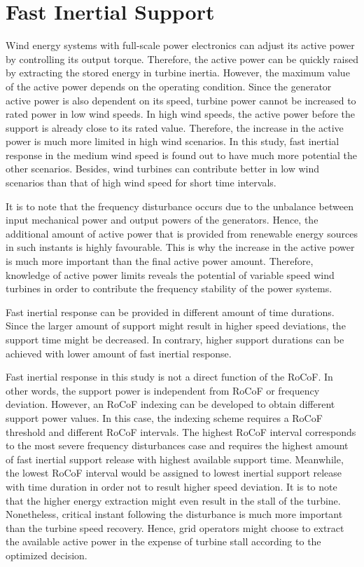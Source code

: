 \section{Fast Inertial Support}
Wind energy systems with full-scale power electronics can adjust its active power by controlling its output torque. Therefore, the active power can be quickly raised by extracting the stored energy in turbine inertia. However, the maximum value of the active power depends on the operating condition. Since the generator active power is also dependent on its speed, turbine power cannot be increased to rated power in low wind speeds. In high wind speeds, the active power before the support is already close to its rated value. Therefore, the increase in the active power is much more limited in high wind scenarios. In this study, fast inertial response in the medium wind speed is found out to have much more potential the other scenarios. Besides, wind turbines can contribute better in low wind scenarios than that of high wind speed for short time intervals.\par
It is to note that the frequency disturbance occurs due to the unbalance between input mechanical power and output powers of the generators. Hence, the additional amount of active power that is provided from renewable energy sources in such instants is highly favourable. This is why the increase in the active power is much more important than the final active power amount. Therefore, knowledge of active power limits reveals the potential of variable speed wind turbines in order to contribute the frequency stability of the power systems.\par
Fast inertial response can be provided in different amount of time durations. Since the larger amount of support might result in higher speed deviations, the support time might be decreased. In contrary, higher support durations can be achieved with lower amount of fast inertial response.\par
Fast inertial response in this study is not a direct function of the RoCoF. In other words, the support power is independent from RoCoF or frequency deviation. However, an RoCoF indexing can be developed to obtain different support power values. In this case, the indexing scheme requires a RoCoF threshold and different RoCoF intervals. The highest RoCoF interval corresponds to the most severe frequency disturbances case and requires the highest amount of fast inertial support release with highest available support time. Meanwhile, the lowest RoCoF interval would be assigned to lowest inertial support release with time duration in order not to result higher speed deviation. It is to note that the higher energy extraction might even result in the stall of the turbine. Nonetheless, critical instant following the disturbance is much more important than the turbine speed recovery. Hence, grid operators might choose to extract the available active power in the expense of turbine stall according to the optimized decision.

